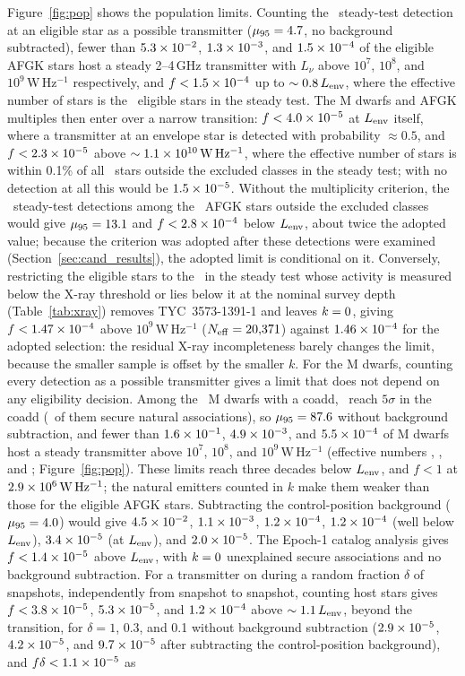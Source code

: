 \documentclass[linenumbers]{aastex702}
\newcommand{\Lnu}{L_\nu}
\newcommand{\WHz}{\mathrm{W\,Hz^{-1}}}
\begin{document}
Figure~\ref{fig:pop} shows the population limits. Counting the \KSteady\ steady-test detection at an eligible star as a possible transmitter ($\mu_{95}=4.7$, no background subtracted), fewer than $5.3\times10^{-2}$, $1.3\times10^{-3}$, and $1.5\times10^{-4}$ of the eligible AFGK stars host a steady 2--4\,GHz transmitter with $\Lnu$ above $10^7$, $10^8$, and $10^9\,\WHz$ respectively, and $f<1.5\times10^{-4}$ up to $\sim0.8\,L_{\rm env}$, where the effective number of stars is the \NEligSteady\ eligible stars in the steady test. The M dwarfs and AFGK multiples then enter over a narrow transition: $f<4.0\times10^{-5}$ at $L_{\rm env}$ itself, where a transmitter at an envelope star is detected with probability $\approx0.5$, and $f<2.3\times10^{-5}$ above $\sim\FloorL\,\WHz$, where the effective number of stars is within 0.1\% of all \NAllFloor\ stars outside the excluded classes in the steady test; with no detection at all this would be $1.5\times10^{-5}$. Without the multiplicity criterion, the \KSteadyWithMult\ steady-test detections among the \NWithMultSteady\ AFGK stars outside the excluded classes would give $\mu_{95}=13.1$ and $f<2.8\times10^{-4}$ below $L_{\rm env}$, about twice the adopted value; because the criterion was adopted after these detections were examined (Section~\ref{sec:cand_results}), the adopted limit is conditional on it. Conversely, restricting the eligible stars to the \NXc\ in the steady test whose activity is measured below the X-ray threshold or lies below it at the nominal survey depth (Table~\ref{tab:xray}) removes TYC~3573-1391-1 and leaves $k=0$, giving $f<1.47\times10^{-4}$ above $10^9\,\WHz$ ($N_{\rm eff}=20{,}371$) against $1.46\times10^{-4}$ for the adopted selection: the residual X-ray incompleteness barely changes the limit, because the smaller sample is offset by the smaller $k$. For the M dwarfs, counting every detection as a possible transmitter gives a limit that does not depend on any eligibility decision. Among the \NMallCoadd\ M dwarfs with a coadd, \KMall\ reach $5\sigma$ in the coadd (\KMallSec\ of them secure natural associations), so $\mu_{95}=87.6$ without background subtraction, and fewer than $1.6\times10^{-1}$, $4.9\times10^{-3}$, and $5.5\times10^{-4}$ of M dwarfs host a steady transmitter above $10^7$, $10^8$, and $10^9\,\WHz$ (effective numbers \NeffMallSeven, \NeffMallEight, and \NeffMallNine; Figure~\ref{fig:pop}). These limits reach three decades below $L_{\rm env}$, and $f<1$ at $\ReachMall\,\WHz$; the natural emitters counted in $k$ make them weaker than those for the eligible AFGK stars. Subtracting the control-position background ($\mu_{95}=4.0$) would give $4.5\times10^{-2}$, $1.1\times10^{-3}$, $1.2\times10^{-4}$, $1.2\times10^{-4}$ (well below $L_{\rm env}$), $3.4\times10^{-5}$ (at $L_{\rm env}$), and $2.0\times10^{-5}$. The Epoch-1 catalog analysis gives $f<1.4\times10^{-5}$ above $L_{\rm env}$, with $k=0$ unexplained secure associations and no background subtraction. For a transmitter on during a random fraction $\delta$ of snapshots, independently from snapshot to snapshot, counting host stars gives $f<3.8\times10^{-5}$, $5.3\times10^{-5}$, and $1.2\times10^{-4}$ above $\sim1.1\,L_{\rm env}$, beyond the transition, for $\delta=1$, 0.3, and 0.1 without background subtraction ($2.9\times10^{-5}$, $4.2\times10^{-5}$, and $9.7\times10^{-5}$ after subtracting the control-position background), and $f\delta<1.1\times10^{-5}$ as 
\end{document}
